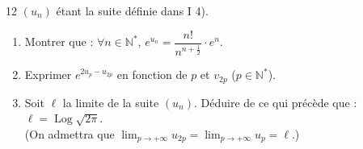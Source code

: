 \documentclass{axiobac}
\begin{document}
\begin{probleme}{12}
$(u_n)$ étant la suite définie dans I 4).

\begin{enumerate}
    \item Montrer que : $\forall n \in \mathbb{N}^*$, $e^{u_n} = \dfrac{n!}{n^{n + \frac12}} \cdot e^n$.
    \item Exprimer $e^{2u_p - u_{2p}}$ en fonction de $p$ et $v_{2p}$ ($p \in \mathbb{N}^*$).
    \item Soit $\ell$ la limite de la suite $(u_n)$. Déduire de ce qui précède que : $\ell = \operatorname{Log}\sqrt{2\pi}$. \\
    (On admettra que $\displaystyle\lim_{p \to +\infty} u_{2p} = \lim_{p \to +\infty} u_p = \ell$.)
\end{enumerate}

\end{probleme}
\end{document}
